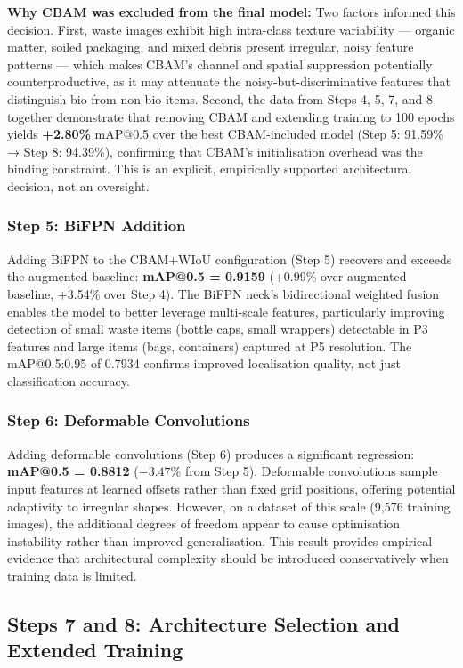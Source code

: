 \textbf{Why CBAM was excluded from the final model:} Two factors informed this decision. First, waste images exhibit high intra-class texture variability — organic matter, soiled packaging, and mixed debris present irregular, noisy feature patterns — which makes CBAM's channel and spatial suppression potentially counterproductive, as it may attenuate the noisy-but-discriminative features that distinguish bio from non-bio items. Second, the data from Steps 4, 5, 7, and 8 together demonstrate that removing CBAM and extending training to 100 epochs yields \textbf{+2.80\%} mAP@0.5 over the best CBAM-included model (Step 5: 91.59\% → Step 8: 94.39\%), confirming that CBAM's initialisation overhead was the binding constraint. This is an explicit, empirically supported architectural decision, not an oversight.

\subsubsection{Step 5: BiFPN Addition}

Adding BiFPN to the CBAM+WIoU configuration (Step 5) recovers and exceeds the augmented baseline: \textbf{mAP@0.5 = 0.9159} (+0.99\% over augmented baseline, +3.54\% over Step 4). The BiFPN neck's bidirectional weighted fusion enables the model to better leverage multi-scale features, particularly improving detection of small waste items (bottle caps, small wrappers) detectable in P3 features and large items (bags, containers) captured at P5 resolution. The mAP@0.5:0.95 of 0.7934 confirms improved localisation quality, not just classification accuracy.

\subsubsection{Step 6: Deformable Convolutions}

Adding deformable convolutions (Step 6) produces a significant regression: \textbf{mAP@0.5 = 0.8812} ($-3.47\%$ from Step 5). Deformable convolutions sample input features at learned offsets rather than fixed grid positions, offering potential adaptivity to irregular shapes. However, on a dataset of this scale (9,576 training images), the additional degrees of freedom appear to cause optimisation instability rather than improved generalisation. This result provides empirical evidence that architectural complexity should be introduced conservatively when training data is limited.

\subsection{Steps 7 and 8: Architecture Selection and Extended Training}

